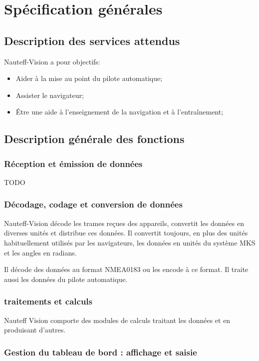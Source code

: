 \documentclass[a4paper,11pt]{report}
\begin{document}
\chapter{Spécification générales}
\section{Description des services attendus}

Nauteff-Vision a pour objectifs:
\begin{itemize}
	\item Aider à la mise au point du pilote automatique;
	\item Assister le navigateur;
 	\item Être une aide à l'enseignement de la navigation et à l'entraînement;
\end{itemize}


\section{Description générale des fonctions}

\subsection{Réception et émission de données}
TODO
\subsection{Décodage, codage et conversion de données}

Nauteff-Vision décode les trames reçues des appareils,
convertit les données en diverses unités et distribue ces données.
Il convertit toujours, en plus des unités habituellement utilisés
par les navigateurs, les données en unités du système MKS et les angles en radians.

Il décode des données au format \gls{NMEA0183} ou les encode à ce format.
Il traite aussi les données du pilote automatique.


\subsection{traitements et calculs}

Nauteff Vision comporte des modules de calculs traitant les données
et en produisant d'autres.


\subsection{Gestion du tableau de bord : affichage et saisie}
\end{document}
